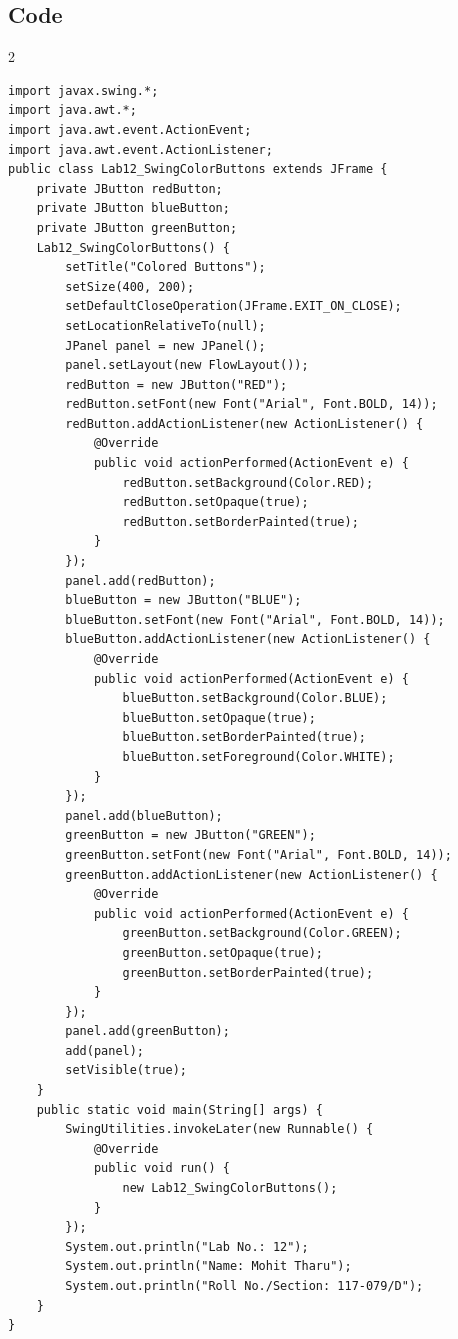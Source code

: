 \documentclass[10pt,a4paper]{article}
\begin{document}
\subsection*{Code}
\begin{multicols}{2}
\begin{lstlisting}
import javax.swing.*;
import java.awt.*;
import java.awt.event.ActionEvent;
import java.awt.event.ActionListener;
public class Lab12_SwingColorButtons extends JFrame {
    private JButton redButton;
    private JButton blueButton;
    private JButton greenButton;
    Lab12_SwingColorButtons() {
        setTitle("Colored Buttons");
        setSize(400, 200);
        setDefaultCloseOperation(JFrame.EXIT_ON_CLOSE);
        setLocationRelativeTo(null);
        JPanel panel = new JPanel();
        panel.setLayout(new FlowLayout());
        redButton = new JButton("RED");
        redButton.setFont(new Font("Arial", Font.BOLD, 14));
        redButton.addActionListener(new ActionListener() {
            @Override
            public void actionPerformed(ActionEvent e) {
                redButton.setBackground(Color.RED);
                redButton.setOpaque(true);
                redButton.setBorderPainted(true);
            }
        });
        panel.add(redButton);
        blueButton = new JButton("BLUE");
        blueButton.setFont(new Font("Arial", Font.BOLD, 14));
        blueButton.addActionListener(new ActionListener() {
            @Override
            public void actionPerformed(ActionEvent e) {
                blueButton.setBackground(Color.BLUE);
                blueButton.setOpaque(true);
                blueButton.setBorderPainted(true);
                blueButton.setForeground(Color.WHITE);
            }
        });
        panel.add(blueButton);
        greenButton = new JButton("GREEN");
        greenButton.setFont(new Font("Arial", Font.BOLD, 14));
        greenButton.addActionListener(new ActionListener() {
            @Override
            public void actionPerformed(ActionEvent e) {
                greenButton.setBackground(Color.GREEN);
                greenButton.setOpaque(true);
                greenButton.setBorderPainted(true);
            }
        });
        panel.add(greenButton);
        add(panel);
        setVisible(true);
    }
    public static void main(String[] args) {
        SwingUtilities.invokeLater(new Runnable() {
            @Override
            public void run() {
                new Lab12_SwingColorButtons();
            }
        });
        System.out.println("Lab No.: 12");
        System.out.println("Name: Mohit Tharu");
        System.out.println("Roll No./Section: 117-079/D");
    }
}
\end{lstlisting}
\end{multicols}
\end{document}

